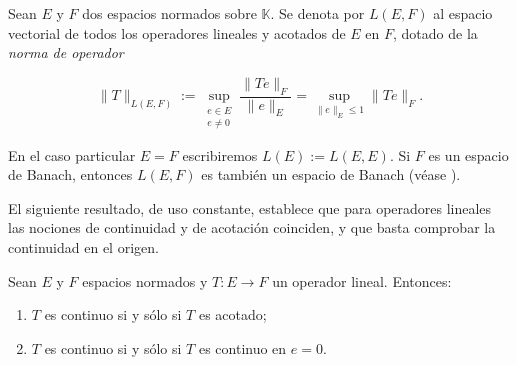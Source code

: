 \begin{Definicion}
\label{ch:preliminares:def:espacioOperadores}

Sean $E$ y $F$ dos espacios normados sobre $\mathbb{K}$. Se denota por $L(E, F)$
al espacio vectorial de todos los operadores lineales y acotados de $E$ en $F$,
dotado de la \textit{norma de operador}

\[\lVert T \rVert_{L(E, F)} := \sup_{\substack{e \in E \\ e \neq 0}} \frac{\lVert Te \rVert_F}{\lVert e \rVert_E} = \sup_{\lVert e \rVert_E \leq 1} \lVert Te \rVert_F.\]

En el caso particular $E = F$ escribiremos $L(E) := L(E, E)$. Si $F$ es un
espacio de Banach, entonces $L(E, F)$ es también un espacio de Banach
(véase \cite[Cap.~2]{brezis-2011-fun-ana-sob}).
\end{Definicion}

El siguiente resultado, de uso constante, establece que para operadores lineales
las nociones de continuidad y de acotación coinciden, y que basta comprobar la
continuidad en el origen.\\

\begin{Teorema}
\label{ch:preliminares:th:continuoAcotado}

Sean $E$ y $F$ espacios normados y $T : E \rightarrow F$ un operador lineal.
Entonces:

\begin{enumerate}
    \item $T$ es continuo si y sólo si $T$ es acotado;

    \item $T$ es continuo si y sólo si $T$ es continuo en $e = 0$.
\end{enumerate}
\end{Teorema}

